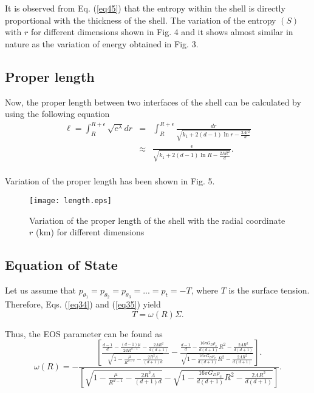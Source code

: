 \documentclass[preprint,12pt]{elsarticle}
\begin{document}
It is observed from Eq. (\ref{eq45}) that the entropy within the shell is directly
proportional with the thickness of the shell. The variation of the entropy $(S)$
with $r$ for different dimensions shown in Fig. 4 and it shows almost similar
in nature as the variation of energy obtained in Fig. 3.



\subsection{Proper length}
Now, the proper length between two interfaces of the shell can be
calculated by using the following equation
\begin{eqnarray}
\ell = \int _{R}^{R+\epsilon} \sqrt{e^{\lambda} } dr
&=& \int_{R}^{R+\epsilon} \frac{dr}{{\sqrt{k_{1}+ 2 (d-1) \ln r - \frac{2\Lambda r^2}{d}}}}\nonumber\\
 &\approx& \frac{\epsilon}{\sqrt{k_{1}+ 2 (d-1) \ln R - \frac{2\Lambda R^2}{d}}}.\nonumber\\ \label{eq46}
\end{eqnarray}

Variation of the proper length has been shown in Fig. 5.


\begin{figure*} [thbp]
\centering
\texttt{[image: length.eps]}
\caption{Variation of the proper length of the shell with the radial coordinate $r$ (km) for different
dimensions}
\end{figure*}


\subsection{Equation of State}
 Let us assume that $p_{\theta_{1}}=p_{\theta_{2}}=p_{\theta_{3}}=...=p_t=-T$,
where $T$ is the surface tension. Therefore, Eqs. (\ref{eq34}) and (\ref{eq35}) yield
\begin{equation}
T=\omega(R)\Sigma. \label{eq47}
\end{equation}

Thus, the EOS parameter can be found as
\begin{equation}
\omega(R)=-\frac{\left[\frac{\frac{d-1}{d}-\frac{(d-1)\mu}{2dR^{d-1}}-\frac{2\Lambda R^2}{d(d+1)}}{\sqrt{1 - \frac{\mu}{ R^{d-1}}-\frac{2R^2 \Lambda}{(d+1)d}}}-\frac{\frac{d-1}{d}-\frac{16\pi G_D\rho_c}{d(d+1)}R^2-\frac{2\Lambda R^2}{d(d+1)}}{\sqrt{ 1-\frac{16\pi G_D\rho_c}{d(d+1)}R^2-\frac{2\Lambda R^2}{d(d+1)}}}\right].}{\left[\sqrt{1 - \frac{\mu}{ R^{d-1}}-\frac{2R^2 \Lambda}{(d+1)d}}-\sqrt{ 1-\frac{16\pi G_D\rho_c}{d(d+1)}R^2-\frac{2\Lambda R^2}{d(d+1)}}\right]}.\label{eq48}
\end{equation}
\end{document}
